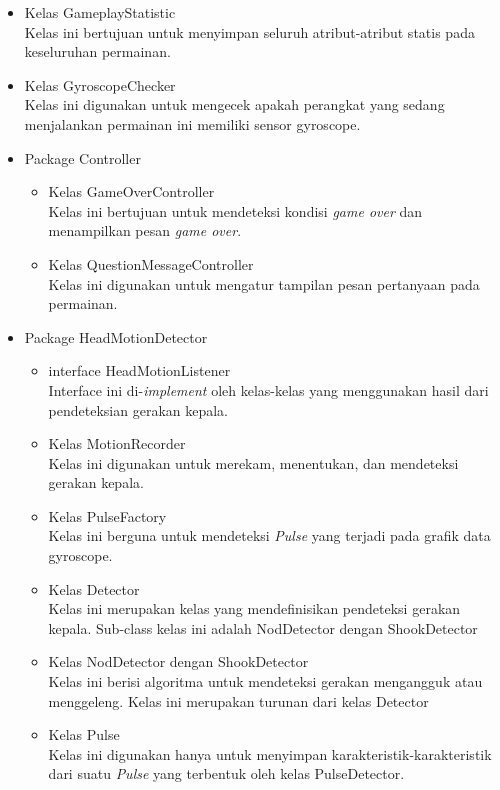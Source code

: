 \begin{itemize}
    \item Kelas GameplayStatistic\\
    Kelas ini bertujuan untuk menyimpan seluruh atribut-atribut statis pada keseluruhan permainan.
    \item Kelas GyroscopeChecker\\
    Kelas ini digunakan untuk mengecek apakah perangkat yang sedang menjalankan permainan ini memiliki sensor gyroscope.
    \item Package Controller
    \begin{itemize}
        \item Kelas GameOverController\\
        Kelas ini bertujuan untuk mendeteksi kondisi \textit{game over} dan menampilkan pesan \textit{game over}.
        \item Kelas QuestionMessageController\\
        Kelas ini digunakan untuk mengatur tampilan pesan pertanyaan pada permainan. 
    \end{itemize}
    \item Package HeadMotionDetector
    \begin{itemize}
        \item interface HeadMotionListener\\
        Interface ini di-\textit{implement} oleh kelas-kelas yang menggunakan hasil dari pendeteksian gerakan kepala.
        \item Kelas MotionRecorder\\
        Kelas ini digunakan untuk merekam, menentukan, dan mendeteksi gerakan kepala. 
        \item Kelas PulseFactory\\
        Kelas ini berguna untuk mendeteksi \textit{Pulse} yang terjadi pada grafik data gyroscope.
        \item Kelas Detector\\
        Kelas ini merupakan kelas yang mendefinisikan pendeteksi gerakan kepala. Sub-class kelas ini adalah NodDetector dengan ShookDetector
        \item Kelas NodDetector dengan ShookDetector\\
        Kelas ini berisi algoritma untuk mendeteksi gerakan mengangguk atau menggeleng. Kelas ini merupakan turunan dari kelas Detector
        \item Kelas Pulse\\
        Kelas ini digunakan hanya untuk menyimpan karakteristik-karakteristik dari suatu \textit{Pulse} yang terbentuk oleh kelas PulseDetector. 
    \end{itemize}
\end{itemize}